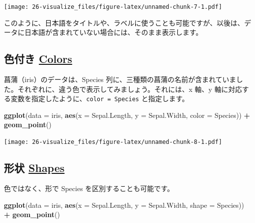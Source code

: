 \documentclass[
  xelatex, ja=standard]{bxjsbook}
\newenvironment{Shaded}{\begin{snugshade}}{\end{snugshade}}
\newcommand{\AttributeTok}[1]{\textcolor[rgb]{0.13,0.29,0.53}{#1}}
\newcommand{\FunctionTok}[1]{\textcolor[rgb]{0.13,0.29,0.53}{\textbf{#1}}}
\newcommand{\NormalTok}[1]{#1}
\newcommand{\SpecialCharTok}[1]{\textcolor[rgb]{0.81,0.36,0.00}{\textbf{#1}}}
\theoremstyle{definition}
\theoremstyle{definition}
\theoremstyle{definition}
\theoremstyle{definition}
\theoremstyle{remark}
\begin{document}
\texttt{[image: 26-visualize\_files/figure-latex/unnamed-chunk-7-1.pdf]}

このように、日本語をタイトルや、ラベルに使うことも可能ですが、以後は、データに日本語が含まれていない場合には、そのまま表示します。

\hypertarget{ux8272ux4ed8ux304d-colors}{%
\subsection{\texorpdfstring{色付き \href{https://ggplot2.tidyverse.org/reference/aes_colour_fill_alpha.html}{Colors}}{色付き Colors}}\label{ux8272ux4ed8ux304d-colors}}

菖蒲（iris）のデータは、Species 列に、三種類の菖蒲の名前が含まれていました。それぞれに、違う色で表示してみましょう。それには、x 軸、y 軸に対応する変数を指定したように、\texttt{color\ =\ Species} と指定します。

\begin{Shaded}
\begin{Highlighting}[]
\FunctionTok{ggplot}\NormalTok{(}\AttributeTok{data =}\NormalTok{ iris, }\FunctionTok{aes}\NormalTok{(}\AttributeTok{x =}\NormalTok{ Sepal.Length, }\AttributeTok{y =}\NormalTok{ Sepal.Width, }\AttributeTok{color =}\NormalTok{ Species)) }\SpecialCharTok{+}
  \FunctionTok{geom\_point}\NormalTok{()}
\end{Highlighting}
\end{Shaded}

\texttt{[image: 26-visualize\_files/figure-latex/unnamed-chunk-8-1.pdf]}

\hypertarget{ux5f62ux72b6-shapes}{%
\subsection{\texorpdfstring{形状 \href{https://ggplot2.tidyverse.org/articles/ggplot2-specs.html}{Shapes}}{形状 Shapes}}\label{ux5f62ux72b6-shapes}}

色ではなく、形で Species を区別することも可能です。

\begin{Shaded}
\begin{Highlighting}[]
\FunctionTok{ggplot}\NormalTok{(}\AttributeTok{data =}\NormalTok{ iris, }\FunctionTok{aes}\NormalTok{(}\AttributeTok{x =}\NormalTok{ Sepal.Length, }\AttributeTok{y =}\NormalTok{ Sepal.Width, }\AttributeTok{shape =}\NormalTok{ Species)) }\SpecialCharTok{+}
  \FunctionTok{geom\_point}\NormalTok{()}
\end{Highlighting}
\end{Shaded}
\end{document}
